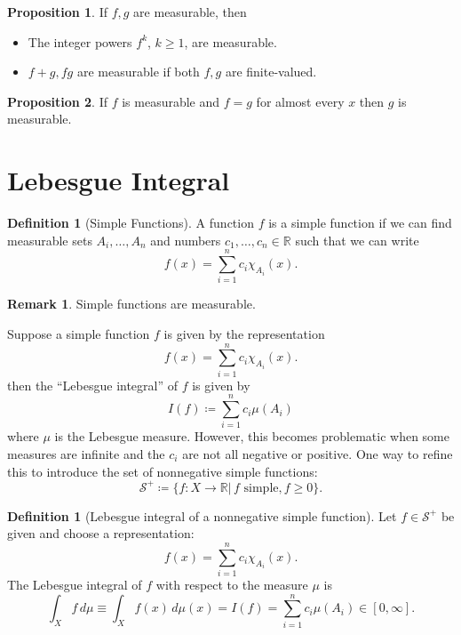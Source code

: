 \documentclass{article}
\theoremstyle{definition}
\newtheorem{prop}{Proposition}[section]
\theoremstyle{theorem}
\newtheorem{definition}[theorem]{Definition}
\newtheorem{remark}{Remark}
\begin{document}
\begin{prop}
If $f,g$ are measurable, then 
\begin{itemize}
    \item The integer powers $f^k$, $k\geq 1$, are measurable. 
    
    \item $f+g,f g$ are measurable if both $f,g$ are finite-valued. 
\end{itemize}
\end{prop}


\begin{prop}
If $f$ is measurable and $f=g$ for almost every $x$ then $g$ is measurable. 
\end{prop}

\section{Lebesgue Integral}

\begin{definition}[Simple Functions] 
A function $f$ is a simple function if we can find measurable sets $A_i,\dots, A_n$ and numbers $c_1,\dots,c_n \in \mathbb{R}$ such that we can write 
\begin{equation*}
    f(x) = \sum^n_{i=1}c_i \chi_{A_i}(x).
\end{equation*}
\end{definition}

\begin{remark}
Simple functions are measurable.
\end{remark}

Suppose a simple function $f$ is given by the representation 
\begin{equation*}
    f(x) = \sum^n_{i=1}c_i \chi_{A_i}(x).
\end{equation*}
then the ``Lebesgue integral'' of $f$ is given by
\begin{equation*}
    I(f) \coloneqq \sum^n_{i=1} c_i \mu(A_i)
\end{equation*}
where $\mu$ is the Lebesgue measure. However, this becomes problematic when some measures are infinite and the $c_i$ are not all negative or positive. One way to refine this to introduce the set of nonnegative simple functions:
\begin{equation*}
    \mathcal{S}^+ \coloneqq \{ f: X\to \mathbb{R} \vert\, f \text{ simple}, f\geq 0 \}.
\end{equation*}


\begin{definition}[Lebesgue integral of a nonnegative simple function]
Let $f \in \mathcal{S}^+$ be given and choose a representation:
\begin{equation*}
    f(x) = \sum^n_{i=1}c_i \chi_{A_i}(x).
\end{equation*}
The Lebesgue integral of $f$ with respect to the measure $\mu$ is 
\begin{equation*}
    \int_X f\,d\mu \equiv \int_X f(x)\,d\mu(x) = I(f) = \sum^n_{i=1} c_i \mu(A_i) \in [0,\infty].
\end{equation*}
\end{definition}
\end{document}

